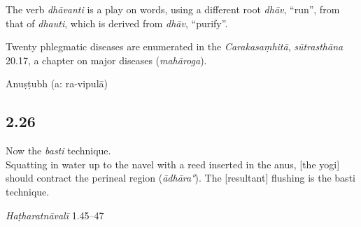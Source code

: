 \begin{ekdosis}
\begin{testimonia}[hp02_025]
\end{testimonia}

\begin{philcomm}[hp02_025]
The verb \emph{dhāvanti} is a play on words, using a different root \emph{dhāv}, “run”, from that of \emph {dhauti}, which is derived from \emph{dhāv}, “purify”.

Twenty phlegmatic diseases are enumerated in the \emph{Carakasaṃhitā}, \emph{sūtrasthāna} 20.17, a chapter on major diseases (\emph{mahāroga}). %
\end{philcomm}

\begin{metre}[hp02_025]
Anuṣṭubh (a: ra-vipulā)
\end{metre}

\subsection*{2.26}
\begin{translation}[hp02_026]
Now the \emph{basti} technique.\\
Squatting in water up to the navel with a reed inserted in the anus, [the yogi] should contract the perineal region (\emph{ādhāra°}). The [resultant] flushing is the basti technique.
\end{translation}

\begin{sources}[hp02_026]
\end{sources}

\begin{testimonia}[hp02_026]
\emph{Haṭharatnāvalī} 1.45–47

\begin{versinnote}
\end{versinnote} 


\end{testimonia}
\end{ekdosis}
